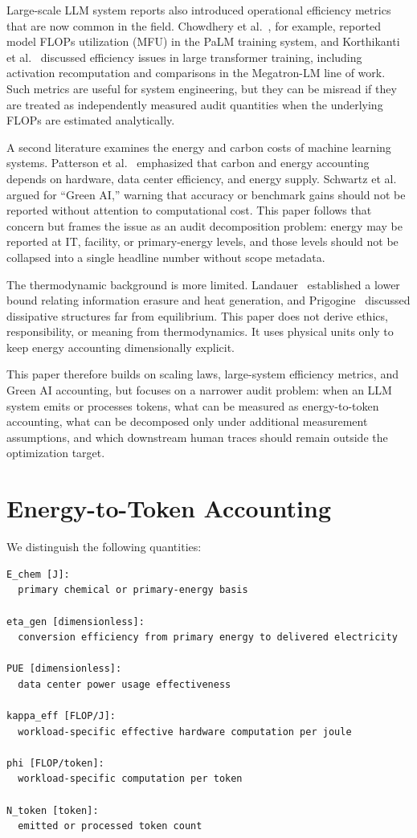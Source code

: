 \documentclass[11pt]{article}
\begin{document}
Large-scale LLM system reports also introduced operational efficiency metrics that are now common in the field. Chowdhery et al.~\cite{chowdhery2022palm}, for example, reported model FLOPs utilization (MFU) in the PaLM training system, and Korthikanti et al.~\cite{korthikanti2022reducing} discussed efficiency issues in large transformer training, including activation recomputation and comparisons in the Megatron-LM line of work. Such metrics are useful for system engineering, but they can be misread if they are treated as independently measured audit quantities when the underlying FLOPs are estimated analytically.

A second literature examines the energy and carbon costs of machine learning systems. Patterson et al.~\cite{patterson2021carbon} emphasized that carbon and energy accounting depends on hardware, data center efficiency, and energy supply. Schwartz et al.~\cite{schwartz2020green} argued for ``Green AI,'' warning that accuracy or benchmark gains should not be reported without attention to computational cost. This paper follows that concern but frames the issue as an audit decomposition problem: energy may be reported at IT, facility, or primary-energy levels, and those levels should not be collapsed into a single headline number without scope metadata.

The thermodynamic background is more limited. Landauer~\cite{landauer1961irreversibility} established a lower bound relating information erasure and heat generation, and Prigogine~\cite{prigogine1978time} discussed dissipative structures far from equilibrium. This paper does not derive ethics, responsibility, or meaning from thermodynamics. It uses physical units only to keep energy accounting dimensionally explicit.

This paper therefore builds on scaling laws, large-system efficiency metrics, and Green AI accounting, but focuses on a narrower audit problem: when an LLM system emits or processes tokens, what can be measured as energy-to-token accounting, what can be decomposed only under additional measurement assumptions, and which downstream human traces should remain outside the optimization target.

\section{Energy-to-Token Accounting}

We distinguish the following quantities:

\begin{verbatim}
E_chem [J]:
  primary chemical or primary-energy basis

eta_gen [dimensionless]:
  conversion efficiency from primary energy to delivered electricity

PUE [dimensionless]:
  data center power usage effectiveness

kappa_eff [FLOP/J]:
  workload-specific effective hardware computation per joule

phi [FLOP/token]:
  workload-specific computation per token

N_token [token]:
  emitted or processed token count
\end{verbatim}
\end{document}
